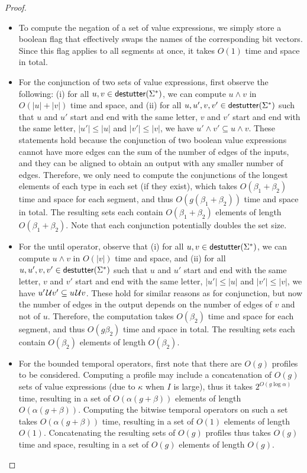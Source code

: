 \begin{proof}
\begin{enumerate}
\begin{itemize}
			\item 
			To compute the negation of a set of value expressions, we simply store a boolean flag that effectively swaps the names of the corresponding bit vectors.
			Since this flag applies to all segments at once, it takes $O(1)$ time and space in total.
						
			\item
			For the conjunction of two sets of value expressions, first observe the following:
			(i) for all $u,v \in \mathsf{destutter}(\Sigma^*)$, we can compute $u \land v$ in $O(|u|+|v|)$ time and space, and
			(ii) for all $u, u', v, v' \in \mathsf{destutter}(\Sigma^*)$ such that $u$ and $u'$ start and end with the same letter, $v$ and $v'$ start and end with the same letter, $|u'| \leq |u|$ and $|v'| \leq |v|$, we have $u' \land v' \subseteq u \land v$.
			These statements hold because the conjunction of two boolean value expressions cannot have more edges can the sum of the number of edges of the inputs, and they can be aligned to obtain an output with any smaller number of edges. 
			Therefore, we only need to compute the conjunctions of the longest elements of each type in each set (if they exist), which takes $O(\beta_1 + \beta_2)$ time and space for each segment, and thus $O(g (\beta_1 + \beta_2))$ time and space in total.
			The resulting sets each contain $O(\beta_1 + \beta_2)$ elements of length $O(\beta_1 + \beta_2)$.
			Note that each conjunction potentially doubles the set size.
			
			\item
			For the until operator, observe that 
			(i) for all $u,v \in \mathsf{destutter}(\Sigma^*)$, we can compute $u \land v$ in $O(|v|)$ time and space, and
			(ii) for all $u, u', v, v' \in \mathsf{destutter}(\Sigma^*)$ such that $u$ and $u'$ start and end with the same letter, $v$ and $v'$ start and end with the same letter, $|u'| \leq |u|$ and $|v'| \leq |v|$, we have $u' \kern.1em\mathcal{U} v' \subseteq u \kern.1em\mathcal{U} v$.
			These hold for similar reasons as for conjunction, but now the number of edges in the output depends on the number of edges of $v$ and not of $u$. 
			Therefore, the computation takes $O(\beta_2)$ time and space for each segment, and thus $O(g \beta_2)$ time and space in total.
			The resulting sets each contain $O(\beta_2)$ elements of length $O(\beta_2)$.
			
			\item
			For the bounded temporal operators, first note that there are $O(g)$ profiles to be considered.
			Computing a profile may include a concatenation of $O(g)$ sets of value expressions (due to $\kappa$ when $I$ is large), thus it takes $2^{O(g \log \alpha)}$ time, resulting in a set of $O(\alpha (g + \beta))$ elements of length $O(\alpha (g + \beta))$.
			Computing the bitwise temporal operators on such a set takes $O(\alpha (g + \beta))$ time, resulting in a set of $O(1)$ elements of length $O(1)$.
			Concatenating the resulting sets of $O(g)$ profiles thus takes $O(g)$ time and space, resulting in a set of $O(g)$ elements of length $O(g)$.			
			

\end{itemize}
\end{enumerate}
\end{proof}
